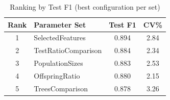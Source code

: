 \begin{table}[ht]\centering
\caption{Ranking by Test F1 (best configuration per set)}\label{tab:ranking}
\begin{tabular}{c l S[table-format=1.3] S[table-format=2.2]}
\toprule
\textbf{Rank} & \textbf{Parameter Set} & {\textbf{Test F1}} & {\textbf{CV\%}} \\
 & SelectedFeatures & 0.894 & 2.84 \\
2 & TestRatioComparison & 0.884 & 2.34 \\
3 & PopulationSizes & 0.883 & 2.53 \\
4 & OffspringRatio & 0.880 & 2.15 \\
5 & TreesComparison & 0.878 & 3.26 \\
\bottomrule\end{tabular}\end{table}
